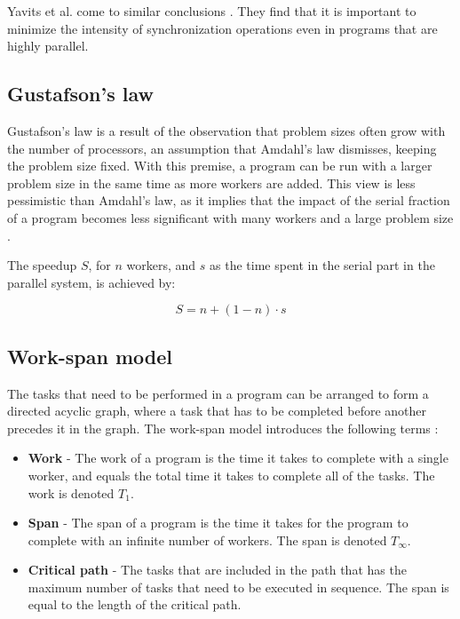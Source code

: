 Yavits et al. come to similar conclusions \cite{yavits_2014_effect_teocasoalims}. They find that it is important to minimize the
intensity of synchronization operations even in programs that are highly parallel.

\subsection{Gustafson's law}
Gustafson's law \cite{gustafson_1988_reevaluating_ral} is a result of the observation that problem sizes often grow with the
number of processors, an assumption that Amdahl's law dismisses, keeping the problem size fixed. With this premise, a program can
be run with a larger problem size in the same time as more workers are added. This view is less pessimistic than Amdahl's law, as
it implies that the impact of the serial fraction of a program becomes less significant with many workers and a large problem
size \cite[p. 61-62]{mccool_2012_structured_spppfec}.

The speedup $S$, for $n$ workers, and $s$ as the time spent in the serial part in the parallel system, is achieved by:

\begin{displaymath}
  S = n + (1-n) \cdot s
\end{displaymath}

\subsection{Work-span model} \label{work-span}
The tasks that need to be performed in a program can be arranged to form a directed acyclic graph, where a task that
has to be completed before another precedes it in the graph. The work-span model introduces the following terms
\cite[p. 62-65]{mccool_2012_structured_spppfec}:
\begin{itemize}
  \item \textbf{Work} - The work of a program is the time it takes to complete with a single worker, and equals the total time it
    takes to complete all of the tasks. The work is denoted $T_1$.
  \item \textbf{Span} - The span of a program is the time it takes for the program to complete with an infinite number of workers.
    The span is denoted $T_\infty$.
  \item \textbf{Critical path} - The tasks that are included in the path that has the maximum number of tasks that need
    to be executed in sequence. The span is equal to the length of the critical path.
\end{itemize}

